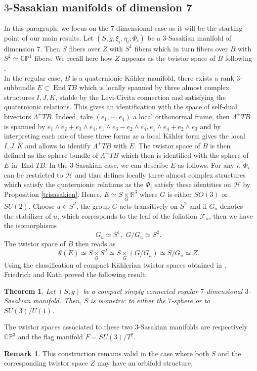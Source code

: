 \documentclass[12pt, reqno]{amsart}
\newtheorem{theo}[Def]{Theorem}
\theoremstyle{definition}
\newtheorem{rk}{Remark}[subsection]
\DeclareMathOperator\End{End}
\newcommand{\R}{\mathbb{R}}
\newcommand{\C}{\mathbb{C}}
\newcommand{\p}{\mathbb{P}}
\newcommand{\F}{\mathcal{F}}
\begin{document}
\subsection{$3$-Sasakian manifolds of dimension 7}\label{3.3} In this paragraph, we focus on the $7$ dimensional case as it will be the starting point of our main results. Let $(S,g,\xi_i,\eta_i,\Phi_i)$ be a $3$-Sasakian manifold of dimension $7$. Then $S$ fibers over $Z$ with $S^1$ fibers which in turn fibers over $B$ with $S^2\simeq\C\p^1$ fibers. We recall here how $Z$ appears as the twistor space of $B$ following \cite{quaternionkahler}. \\ 
\indent In the regular case, $B$ is a quaternionic Kähler manifold, there exists a rank $3$-subbundle $E\subset\End TB$ which is locally spanned by three almost complex structures $I,J,K$, stable by the Levi-Civita connection and satisfying the quaternionic relations. This gives an identification with the space of self-dual bivectors $\Lambda^+TB$. Indeed, take $(e_1,\cdots,e_4)$ a local orthonormal frame, then $\Lambda^+TB$ is spanned by $e_1\wedge e_2+e_3\wedge e_4, e_1\wedge e_3-e_2\wedge e_4, e_1\wedge e_4+e_2\wedge e_3$ and by interpreting each one of these three forms as a local Kähler form gives the local $I,J,K$ and allows to identify $\Lambda^+TB$ with $E$. The twistor space of $B$ is then defined as the sphere bundle of $\Lambda^+TB$ which then is identified with the sphere of $E$ in $\End TB$. In the $3$-Sasakian case, we can describe $E$ as follows. For any $i$, $\Phi_i$ can be restricted to $\mathcal{H}$ and thus defines locally three almost complex structures which satisfy the quaternionic relations as the $\Phi_i$ satisfy these identities on $\mathcal{H}$ by Proposition \ref{trisasakien}. Hence, $E\simeq S\underset{G}{\times}\R^3$ where $G$ is either $SO(3)$ or $SU(2)$. Choose $u\in S^2$, the group $G$ acts transitively on $S^2$ and if $G_u$ denotes the stabilizer of $u$, which corresponds to the leaf of the foliation $\F_u$, then we have the isomorphisms
$$G_u\simeq S^1, \, \, G/G_u\simeq S^2.$$ The twistor space of $B$ then reads as 
$$\mathcal{S}(E)\simeq S\underset{G}{\times}S^2\simeq S\underset{G}{\times}(G/G_u)\simeq S/G_u\simeq Z.$$
\indent Using the classification of compact Kählerian twistor spaces obtained in \cite{Hitchintwistor, twistorspaces}, Friedrich and Kath proved the following result:
\begin{theo}\label{theoremclassification}\cite[Theorem 7]{Friedrich:1990zg}
    Let $(S,g)$ be a compact simply connected regular $7$-dimensional $3$-Sasakian manifold. Then, $S$ is isometric to either the $7$-sphere or to $SU(3)/U(1)$. 
\end{theo}
The twistor spaces associated to these two $3$-Sasakian manifolds are respectively $\C\p^3$ and the flag manifold $F=SU(3)/T^2.$
\begin{rk}
    This construction remains valid in the case where both $S$ and the corresponding twistor space $Z$ may have an orbifold structure.
\end{rk}
\end{document}
